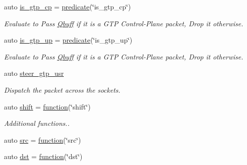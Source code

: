 \begin{DoxyCompactItemize}
auto \hyperlink{namespacepfq_1_1lang_1_1experimental_1_1anonymous__namespace_02experimental_8hpp_03_ade25d79513e3131a54a05e23d25a7539}{is\+\_\+gtp\+\_\+cp} = \hyperlink{namespacepfq_1_1lang_aca9adafc436b7f851621b979fa1aaf88}{predicate}(\char`\"{}is\+\_\+gtp\+\_\+cp\char`\"{})
\begin{DoxyCompactList}\small\item\em Evaluate to {\ttfamily Pass} \hyperlink{structpfq_1_1lang_1_1Qbuff}{Qbuff} if it is a G\+TP Control-\/\+Plane packet, {\ttfamily Drop} it otherwise. \end{DoxyCompactList}\item 
auto \hyperlink{namespacepfq_1_1lang_1_1experimental_1_1anonymous__namespace_02experimental_8hpp_03_a8c12f3cb8c8faaab619e0feb874ed0c3}{is\+\_\+gtp\+\_\+up} = \hyperlink{namespacepfq_1_1lang_aca9adafc436b7f851621b979fa1aaf88}{predicate}(\char`\"{}is\+\_\+gtp\+\_\+up\char`\"{})
\begin{DoxyCompactList}\small\item\em Evaluate to {\ttfamily Pass} \hyperlink{structpfq_1_1lang_1_1Qbuff}{Qbuff} if it is a G\+TP Control-\/\+Plane packet, {\ttfamily Drop} it otherwise. \end{DoxyCompactList}\item 
auto \hyperlink{namespacepfq_1_1lang_1_1experimental_1_1anonymous__namespace_02experimental_8hpp_03_a6b08a2b49251677736f1939eaadac4a6}{steer\+\_\+gtp\+\_\+usr}
\begin{DoxyCompactList}\small\item\em Dispatch the packet across the sockets. \end{DoxyCompactList}\item 
auto \hyperlink{namespacepfq_1_1lang_1_1experimental_1_1anonymous__namespace_02experimental_8hpp_03_ae2d4991027ccd4f2ad64a1e02bfa4679}{shift} = \hyperlink{namespacepfq_1_1lang_a1a4638059d700ae08d0ca63886ff2bb3}{function}(\char`\"{}shift\char`\"{})
\begin{DoxyCompactList}\small\item\em Additional functions.. \end{DoxyCompactList}\item 
auto \hyperlink{namespacepfq_1_1lang_1_1experimental_1_1anonymous__namespace_02experimental_8hpp_03_a9a26dd399154b70de7ed3da9015931fe}{src} = \hyperlink{namespacepfq_1_1lang_a1a4638059d700ae08d0ca63886ff2bb3}{function}(\char`\"{}src\char`\"{})
\item 
auto \hyperlink{namespacepfq_1_1lang_1_1experimental_1_1anonymous__namespace_02experimental_8hpp_03_a7b3e8ac44ecebbfd41420b39a269aeb9}{dst} = \hyperlink{namespacepfq_1_1lang_a1a4638059d700ae08d0ca63886ff2bb3}{function}(\char`\"{}dst\char`\"{})

\end{DoxyCompactItemize}
